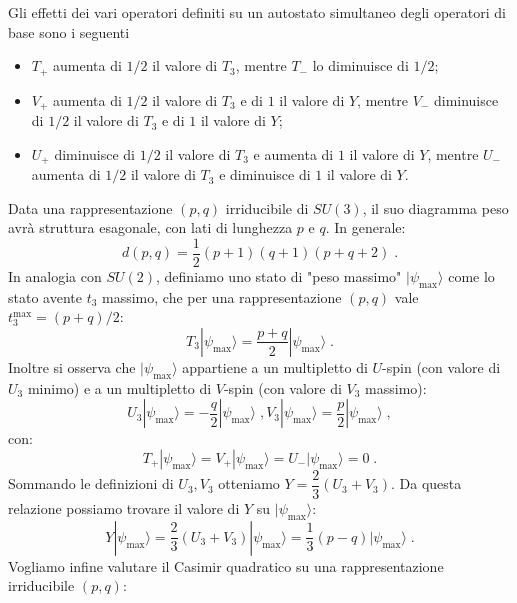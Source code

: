 \documentclass[12pt,a4paper]{article}
\theoremstyle{definition}
\newcommand{\ket}{\rangle}
\numberwithin{equation}{section}
\begin{document}
Gli effetti dei vari operatori definiti su un autostato simultaneo degli operatori di base sono i seguenti
\begin{itemize}
\item $T_+$ aumenta di $1/2$ il valore di $T_3$, mentre $T_-$ lo diminuisce di $1/2$;
\item $V_+$ aumenta di $1/2$ il valore di $T_3$ e di $1$ il valore di $Y$, mentre $V_-$ diminuisce di $1/2$ il valore di $T_3$ e di $1$ il valore di $Y$;
\item $U_+$ diminuisce di $1/2$ il valore di $T_3$ e aumenta di $1$ il valore di $Y$, mentre $U_-$ aumenta di $1/2$ il valore di $T_3$ e diminuisce di $1$ il valore di $Y$.
\end{itemize}
Data una rappresentazione $(p,q)$ irriducibile di $SU(3)$, il suo diagramma peso avrà struttura esagonale, con lati di lunghezza $p$ e $q$. In generale:
\begin{equation}
d(p,q)=\frac{1}{2}(p+1)(q+1)(p+q+2)\;.
\end{equation}
In analogia con $SU(2)$, definiamo uno stato di "peso massimo" $|\psi_{\mathrm{max}}\ket$ come lo stato avente $t_3$ massimo, che per una rappresentazione $(p,q)$ vale $t_3^{\mathrm{max}}=(p+q)/2$:
\begin{equation}
T_3|\psi_{\mathrm{max}}\ket=\frac{p+q}{2}|\psi_{\mathrm{max}}\ket\;.
\end{equation}
Inoltre si osserva che $|\psi_{\mathrm{max}}\ket$ appartiene a un multipletto di $U$-spin (con valore di $U_3$ minimo) e a un multipletto di $V$-spin (con valore di $V_3$ massimo):
\begin{subequations}
\begin{equation}
U_3|\psi_{\mathrm{max}}\ket=-\frac{q}{2}|\psi_{\mathrm{max}}\ket\;,
\end{equation}
\begin{equation}
V_3|\psi_{\mathrm{max}}\ket=\frac{p}{2}|\psi_{\mathrm{max}}\ket\;,
\end{equation}
\end{subequations}
con:
$$
T_+|\psi_{\mathrm{max}}\ket=V_+|\psi_{\mathrm{max}}\ket=U_-|\psi_{\mathrm{max}}\ket=0\;.
$$
Sommando le definizioni di $U_3,V_3$ otteniamo $Y=\dfrac{2}{3}(U_3+V_3)$. Da questa relazione possiamo trovare il valore di $Y$ su $|\psi_{\mathrm{max}}\ket$:
\begin{equation}
Y|\psi_{\mathrm{max}}\ket=\frac{2}{3}(U_3+V_3)|\psi_{\mathrm{max}}\ket=\frac{1}{3}(p-q)|\psi_{\mathrm{max}}\ket\;.
\end{equation}
Vogliamo infine valutare il Casimir quadratico su una rappresentazione irriducibile $(p,q)$:
\end{document}
